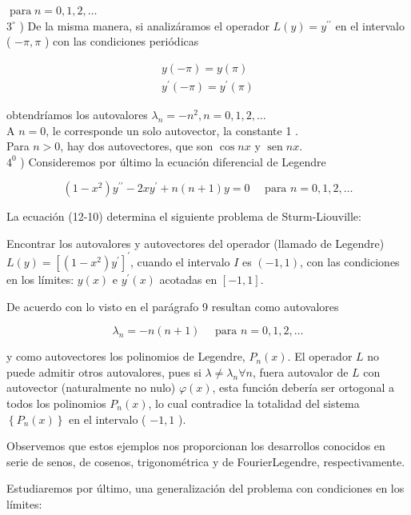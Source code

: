 \documentclass[10pt]{article}
\theoremstyle{plain}
\theoremstyle{definition}
\theoremstyle{remark}
\begin{document}
$\operatorname{para} n=0,1,2, \ldots$\\
$3^{\circ}$ ) De la misma manera, si analizáramos el operador $L(y)=y^{\prime \prime}$ en el intervalo ( $-\pi, \pi$ ) con las condiciones periódicas

$$
\begin{gathered}
y(-\pi)=y(\pi) \\
y^{\prime}(-\pi)=y^{\prime}(\pi)
\end{gathered}
$$

obtendríamos los autovalores $\lambda_{n}=-n^{2}, n=0,1,2, \ldots$\\
A $n=0$, le corresponde un solo autovector, la constante 1 .\\
Para $n>0$, hay dos autovectores, que son $\cos n x$ y $\operatorname{sen} n x$.\\
$4^{0}$ ) Consideremos por último la ecuación diferencial de Legendre


\begin{equation*}
\left(1-x^{2}\right) y^{\prime \prime}-2 x y^{\prime}+n(n+1) y=0 \quad \text { para } n=0,1,2, \ldots \tag{12-10}
\end{equation*}


La ecuación (12-10) determina el siguiente problema de Sturm-Liouville:

Encontrar los autovalores y autovectores del operador (llamado de Legendre) $L(y)=\left[\left(1-x^{2}\right) y^{\prime}\right]^{\prime}$, cuando el intervalo $I$ es $(-1,1)$, con las condiciones en los límites: $y(x)$ e $y^{\prime}(x)$ acotadas en $[-1,1]$.

De acuerdo con lo visto en el parágrafo 9 resultan como autovalores

$$
\lambda_{n}=-n(n+1) \quad \text { para } n=0,1,2, \ldots
$$

y como autovectores los polinomios de Legendre, $P_{n}(x)$. El operador $L$ no puede admitir otros autovalores, pues si $\lambda \neq \lambda_{n} \forall n$, fuera autovalor de $L$ con autovector (naturalmente no nulo) $\varphi(x)$, esta función debería ser ortogonal a todos los polinomios $P_{n}(x)$, lo cual contradice la totalidad del sistema $\left\{P_{n}(x)\right\}$ en el intervalo ( $-1,1$ ).

Observemos que estos ejemplos nos proporcionan los desarrollos conocidos en serie de senos, de cosenos, trigonométrica y de FourierLegendre, respectivamente.

Estudiaremos por último, una generalización del problema con condiciones en los límites:
\end{document}
